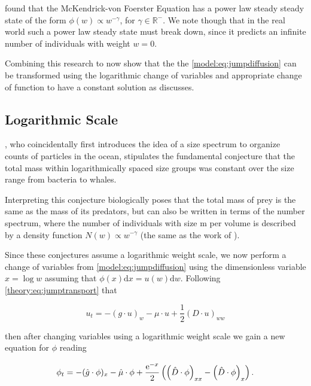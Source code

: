 \documentclass[../main]{subfiles}
\begin{document}
  \cite{benoit2004} found that the McKendrick-von Foerster Equation has a power law steady steady state of the form $\phi(w) \propto w^{-\gamma}$, for $\gamma \in \mathbb{R}^-$. We note though that in the real world such a power law steady state must break down, since it predicts an infinite number of individuals with weight $w = 0$.

  Combining this research to now show that the the \autoref{model:eq:jumpdiffusion} can be transformed using the logarithmic change of variables and appropriate change of function to have a constant solution as \cite{benoit2004} discusses.

  \subsection{Logarithmic Scale}
  \cite{sheldon1967}, who coincidentally first introduces the idea of a size spectrum to organize counts of particles in the ocean, stipulates the fundamental conjecture that the total mass within logarithmically spaced size groups was constant over the size range from bacteria to whales.

  Interpreting this conjecture biologically \cite{silvert1980} poses that the total mass of prey is the same as the mass of its predators, but can also be written in terms of the number spectrum, where the number of individuals with size m per volume is described by a density function $N(w) \propto w^{-\gamma}$ (the same as the work of \cite{benoit2004}).

  Since these conjectures assume a logarithmic weight scale, we now perform a change of variables from \autoref{model:eq:jumpdiffusion} using the dimensionless variable $x = \log{w}$ assuming that $\phi(x) \mathrm{d}x = u(w) \mathrm{d}w$. Following \autoref{theory:eq:jumptransport} that

  \begin{equation}
    u_t = - (g \cdot u)_w - \mu \cdot u + \frac{1}{2} (D \cdot u)_{ww}
  \end{equation}

  then after changing variables using a logarithmic weight scale we gain a new equation for $\phi$ reading

  \begin{equation} \label{model:eq:logscale}
    \phi_t = - (\hat{g} \cdot \phi)_x - \hat{\mu} \cdot \phi + \frac{\operatorname{e}^{-x}}{2} \left( \left( \hat{D} \cdot \phi \right)_{xx} - \left( \hat{D} \cdot \phi \right)_x \right).
  \end{equation}
\end{document}

